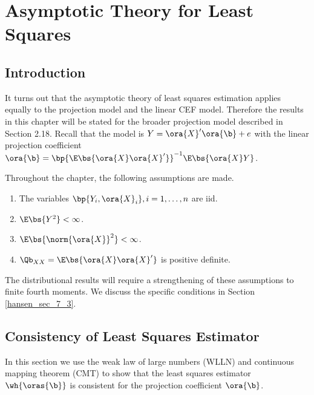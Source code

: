
\setcounter{chapter}{6}
\chapter{Asymptotic Theory for Least Squares}

\section{Introduction}

It turns out that the asymptotic theory of least squares estimation applies equally to the projection model and the linear CEF model. Therefore the results in this chapter will be stated for the broader projection model described in Section 2.18. Recall that the model is $Y = \ora{X}^\prime \ora{\b} + e$ with the linear projection coefficient $\ora{\b} = \bp{\E\bs{\ora{X}\ora{X}^\prime}}^{-1} \E\bs{\ora{X} Y}$.

Throughout the chapter, the following assumptions are made.

\begin{assumption} 
    \label{hansen_ass_7_1}

    \begin{enumerate}[topsep=0pt, leftmargin=20pt, itemsep=0pt, label=(\arabic*)]
        \setlength{\parskip}{10pt} 
        \item The variables $\bp{Y_i, \ora{X}_i}, i=1, \ldots, n$ are iid.
        \item $\E\bs{Y^2} < \infty$.
        \item $\E\bs{\norm{\ora{X}}^2} < \infty$.
        \item $\Qb_{XX} = \E\bs{\ora{X}\ora{X}^\prime}$ is positive definite.
    \end{enumerate}
\end{assumption}

The distributional results will require a strengthening of these assumptions to finite fourth moments. We discuss the specific conditions in Section \ref{hansen_sec_7_3}.

\section{Consistency of Least Squares Estimator} \label{hansen_sec_7_2}

In this section we use the weak law of large numbers (WLLN) and continuous mapping theorem (CMT) to show that the least squares estimator $\wh{\oras{\b}}$ is consistent for the projection coefficient $\ora{\b}$.

